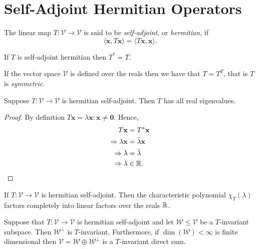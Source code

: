 
\section{Self-Adjoint Hermitian Operators} %
\label{sec:hermitian}

\begin{defn}
 The linear map $T: \mathcal{V} \to \mathcal{V}$ is said to
 be \emph{self-adjoint}, or \emph{hermitian}, if
 \[
  \langle \mathbf{x}, T \mathbf{x} \rangle
  = \langle T \mathbf{x}, \mathbf{x} \rangle.
 \]
\end{defn}

\begin{lem}
 If $T$ is self-adjoint hermitian then $T^{*}=T$.
\end{lem}

\begin{rem}
 If the vector space $\mathcal{V}$ is defined over the reals
 then we have that $T=T^{T}$, that is $T$ is \emph{symmetric}.
\end{rem}

\begin{prop}
 Suppose $T:\mathcal{V} \to \mathcal{V}$ is hermitian self-adjoint.
 Then $T$ has all real eigenvalues.
\end{prop}

\begin{proof}
 By definition $T \mathbf{x} = \lambda \mathbf{x} : \mathbf{x} \neq \mathbf{0}$.
 Hence,
 \begin{align*}
  T \mathbf{x} &= T^{*} \mathbf{x}
  \\
  \Rightarrow \lambda \mathbf{x} &= \bar{\lambda} \mathbf{x}
  \\
  \Rightarrow \lambda &= \bar{\lambda}
  \\
  \Rightarrow \lambda & \in \mathbb{R}. \qedhere
 \end{align*}
\end{proof}

\begin{lem}
 If $T:\mathcal{V} \to \mathcal{V}$ is hermitian self-adjoint.
 Then the characteristic polynomial $\chi_{T}(\lambda)$ factors
 completely into linear factors over the reals $\mathbb{R}$.
\end{lem}

\begin{prop}
 Suppose that $T: \mathcal{V} \to \mathcal{V}$ is hermitian
 self-adjoint and let $\mathcal{W} \leq \mathcal{V}$ be a
 $T$-invariant subspace. Then $\mathcal{W}^{\perp}$ is $T$-invariant.
 Furthermore, if $\dim(\mathcal{W}) < \infty$ is finite dimensional
 then $\mathcal{V} = \mathcal{W} \oplus \mathcal{W}^{\perp}$ is a
 $T$-invariant direct sum.
\end{prop}

